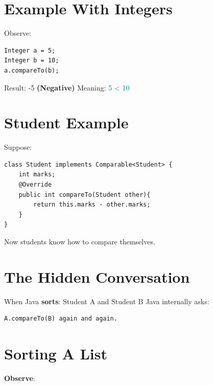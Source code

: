 \documentclass[11pt,a4paper]{book}
\begin{document}



\section{Example With Integers}

Observe:

\begin{verbatim} 
Integer a = 5;
Integer b = 10;
a.compareTo(b);
\end{verbatim}
Result: \textcolor{RosettaOrange}{-5} \textbf{(Negative)}
Meaning: \textcolor{teal}{5 < 10}

\section{Student Example}

Suppose:

\begin{verbatim} 
class Student implements Comparable<Student> {
    int marks;
    @Override
    public int compareTo(Student other){
        return this.marks - other.marks;
    }
}
\end{verbatim}
Now students know how
to compare themselves.
\section{The Hidden Conversation}

When Java \textbf{sorts}:
Student A
and
Student B
Java internally asks:
\begin{verbatim} 
A.compareTo(B) again and again.
\end{verbatim}

\section{Sorting A List}

\textbf{Observe}:
\end{document}
